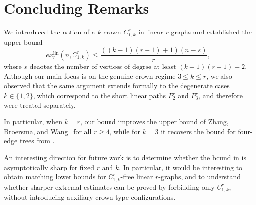 \documentclass[12pt]{article}
\begin{document}
\section*{Concluding Remarks}

We introduced the notion of a $k$-crown $C_{1,k}^r$ in linear $r$-graphs and established the upper bound
\[
ex_r^{\mathrm{lin}}(n,C_{1,k}^r)\le \frac{((k-1)(r-1)+1)(n-s)}{r},
\]
where $s$ denotes the number of vertices of degree at least $(k-1)(r-1)+2$. 
Although our main focus is on the genuine crown regime $3\le k\le r$, we also observed that the same argument extends formally to the degenerate cases $k\in \{1,2\}$, which correspond to the short linear paths $P_2^r$ and $P_3^r$, and therefore were treated separately.

In particular, when $k=r$, our bound improves the upper bound of Zhang, Broersma, and Wang~\cite{zhang2025generalized} for all $r\ge 4$, while for $k=3$ it recovers the bound for four-edge trees from \cite{adak2026bounds}.

An interesting direction for future work is to determine whether the bound in  is asymptotically sharp for fixed $r$ and $k$. In particular, it would be interesting to obtain matching lower bounds for $C_{1,k}^r$-free linear $r$-graphs, and to understand whether sharper extremal estimates can be proved by forbidding only $C_{1,k}^r$, without introducing auxiliary crown-type configurations.


\end{document}
